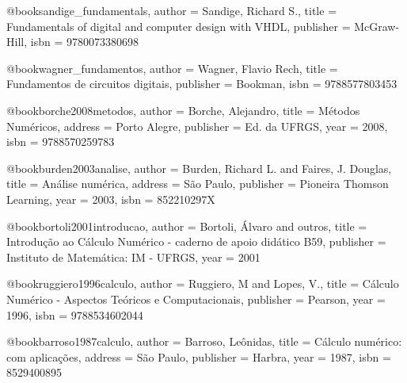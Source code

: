 @book{sandige_fundamentals,
  author = {Sandige, Richard S.},
  title = {Fundamentals of digital and computer design with VHDL},
  publisher = {McGraw-Hill},
  isbn = {9780073380698}
}

@book{wagner_fundamentos,
  author = {Wagner, Flavio Rech},
  title = {Fundamentos de circuitos digitais},
  publisher = {Bookman},
  isbn = {9788577803453}
}


%

@book{borche2008metodos,
  author = {Borche, Alejandro},
  title = {Métodos Numéricos},
  address = {Porto Alegre},
  publisher = {Ed. da UFRGS},
  year = {2008},
  isbn = {9788570259783}
}

@book{burden2003analise,
  author = {Burden, Richard L. and Faires, J. Douglas},
  title = {Análise numérica},
  address = {São Paulo},
  publisher = {Pioneira Thomson Learning},
  year = {2003},
  isbn = {852210297X}
}

@book{bortoli2001introducao,
  author = {Bortoli, Álvaro and outros},
  title = {Introdução ao Cálculo Numérico - caderno de apoio didático B59},
  publisher = {Instituto de Matemática: IM - UFRGS},
  year = {2001}
}

@book{ruggiero1996calculo,
  author = {Ruggiero, M and Lopes, V.},
  title = {Cálculo Numérico - Aspectos Teóricos e Computacionais},
  publisher = {Pearson},
  year = {1996},
  isbn = {9788534602044}
}

@book{barroso1987calculo,
  author = {Barroso, Leônidas},
  title = {Cálculo numérico: com aplicações},
  address = {São Paulo},
  publisher = {Harbra},
  year = {1987},
  isbn = {8529400895}%
}

